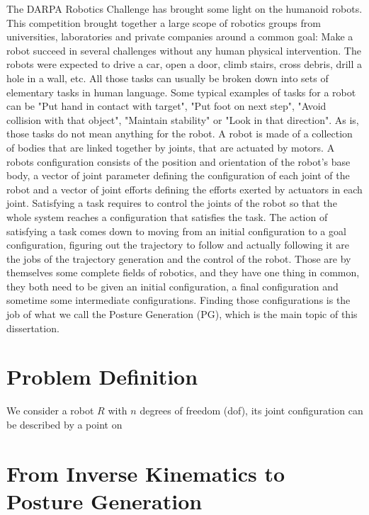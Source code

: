 The DARPA Robotics Challenge has brought some light on the humanoid robots.
This competition brought together a large scope of robotics groups from universities, laboratories and private companies around a common goal: Make a robot succeed in several challenges without any human physical intervention.
The robots were expected to drive a car, open a door, climb stairs, cross debris, drill a hole in a wall, etc.
All those tasks can usually be broken down into sets of elementary tasks in human language.
Some typical examples of tasks for a robot can be "Put hand in contact with target", "Put foot on next step", "Avoid collision with that object", "Maintain stability" or "Look in that direction".
As is, those tasks do not mean anything for the robot.
A robot is made of a collection of bodies that are linked together by joints, that are actuated by motors.
A robots configuration consists of the position and orientation of the robot's base body, a vector of joint parameter defining the configuration of each joint of the robot and a vector of joint efforts defining the efforts exerted by actuators in each joint.
Satisfying a task requires to control the joints of the robot so that the whole system reaches a configuration that satisfies the task.
The action of satisfying a task comes down to moving from an initial configuration to a goal configuration, figuring out the trajectory to follow and actually following it are the jobs of the trajectory generation and the control of the robot.
Those are by themselves some complete fields of robotics, and they have one thing in common, they both need to be given an initial configuration, a final configuration and sometime some intermediate configurations.
Finding those configurations is the job of what we call the Posture Generation (PG), which is the main topic of this dissertation.

\section{Problem Definition}
\label{sec:problem_definition}

We consider a robot $\mathit{R}$ with $n$ degrees of freedom (dof), its joint configuration can be described by a point on

\section{From Inverse Kinematics to Posture Generation}
\label{sec:from_inverse_kinematics_to_posture_generation}

